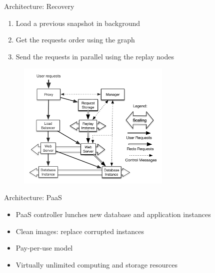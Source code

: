 \begin{frame}[t]{Architecture: Recovery}  
	\vskip-0.7cm
	\begin{enumerate}
		\setlength{\wideitemsep}{0.2cm}
		\item Load a previous snapshot in background
		\item Get the requests order using the graph
		\item Send the requests in parallel using the replay nodes
	\end{enumerate}
	\vskip-0.3cm
	\begin{center}
		\begin{figure} 
		\includegraphics[width=0.65\textwidth]{img/architectureReplay}
		\end{figure}
	\end{center}
	
\end{frame}


\begin{frame}[t]{Architecture: PaaS}
	\begin{itemize}
		\item PaaS controller lunches new database and application instances
		\item Clean images: replace corrupted instances
		\item Pay-per-use model
		\item Virtually unlimited computing and storage resources
	\end{itemize}
\end{frame}



